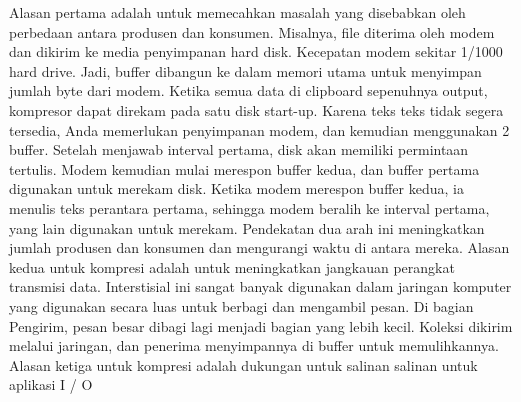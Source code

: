 Alasan pertama adalah untuk memecahkan masalah yang disebabkan oleh perbedaan antara produsen dan konsumen. Misalnya, file diterima oleh modem dan dikirim ke media penyimpanan hard disk. Kecepatan modem sekitar 1/1000 hard drive. Jadi, buffer dibangun ke dalam memori utama untuk menyimpan jumlah byte dari modem. Ketika semua data di clipboard sepenuhnya output, kompresor dapat direkam pada satu disk start-up. Karena teks teks tidak segera tersedia, Anda memerlukan penyimpanan modem, dan kemudian menggunakan 2 buffer. Setelah menjawab interval pertama, disk akan memiliki permintaan tertulis. Modem kemudian mulai merespon buffer kedua, dan buffer pertama digunakan untuk merekam disk. Ketika modem merespon buffer kedua, ia menulis teks perantara pertama, sehingga modem beralih ke interval pertama, yang lain digunakan untuk merekam. Pendekatan dua arah ini meningkatkan jumlah produsen dan konsumen dan mengurangi waktu di antara mereka. Alasan kedua untuk kompresi adalah untuk meningkatkan jangkauan perangkat transmisi data. Interstisial ini sangat banyak digunakan dalam jaringan komputer yang digunakan secara luas untuk berbagi dan mengambil pesan. Di bagian Pengirim, pesan besar dibagi lagi menjadi bagian yang lebih kecil. Koleksi dikirim melalui jaringan, dan penerima menyimpannya di buffer untuk memulihkannya. 
Alasan ketiga untuk kompresi adalah dukungan untuk salinan salinan untuk aplikasi I / O
